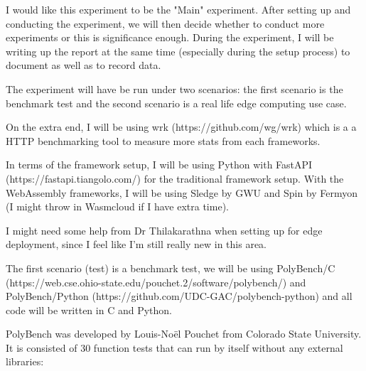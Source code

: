 I would like this experiment to be the "Main" experiment. After setting up and conducting the experiment, we will then decide whether to conduct more experiments or this is significance enough. During the experiment, I will be writing up the report at the same time (especially during the setup process) to document as well as to record data.

The experiment will have be run under two scenarios: the first scenario is the benchmark test and the second scenario is a real life edge computing use case.

On the extra end, I will be using wrk (https://github.com/wg/wrk) which is a a HTTP benchmarking tool to measure more stats from each frameworks.

In terms of the framework setup, I will be using Python with FastAPI (https://fastapi.tiangolo.com/) for the traditional framework setup. With the WebAssembly frameworks, I will be using Sledge by GWU and Spin by Fermyon (I might throw in Wasmcloud if I have extra time).

I might need some help from Dr Thilakarathna when setting up for edge deployment, since I feel like I'm still really new in this area.

The first scenario (test) is a benchmark test, we will be using PolyBench/C (https://web.cse.ohio-state.edu\newline/pouchet.2/software/polybench/) and PolyBench/Python (https://github.com/UDC-GAC/polybench-python) and all code will be written in C and Python.

PolyBench was developed by Louis-Noël Pouchet from Colorado State University. It is consisted of 30 function tests that can run by itself without any external libraries:

